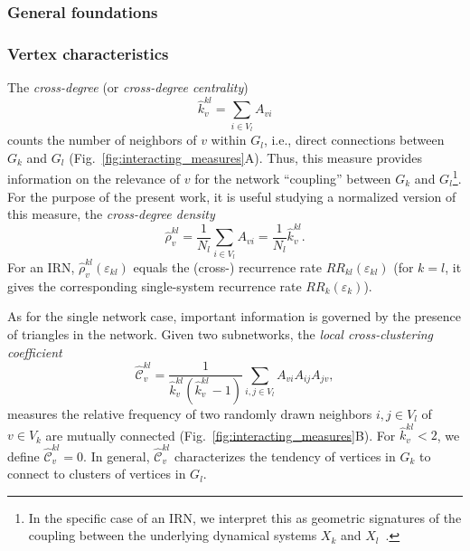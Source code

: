     
		\subsubsection{General foundations}

\subsubsection{Vertex characteristics}

The \textit{cross-degree} (or \textit{cross-degree centrality})
\begin{equation}
\hat{k}_v^{kl} = \sum_{i \in V_l} A_{vi}
\label{eq:degree_cross}
\end{equation}
counts the number of neighbors of $v$ within $G_l$, i.e., direct connections between $G_k$ and $G_l$ (Fig.~\ref{fig:interacting_measures}A). Thus, this measure provides information on the relevance of $v$ for the network ``coupling'' between $G_k$ and $G_l$\footnote{In the specific case of an IRN, we interpret this as geometric signatures of the coupling between the underlying dynamical systems $X_k$ and $X_l$~\cite{Feldhoff2011,Feldhoff2012}.}. For the purpose of the present work, it is useful studying a normalized version of this measure, the \textit{cross-degree density}
\begin{equation}
\hat{\rho}_v^{kl} = \frac{1}{N_l} \sum_{i \in V_l} A_{vi} = \frac{1}{N_l} \hat{k}_v^{kl}.
\label{eq:locrho_cross}
\end{equation}
\noindent
For an IRN, $\hat{\rho}_v^{kl}(\varepsilon_{kl})$ equals the (cross-) recurrence rate $RR_{kl}(\varepsilon_{kl})$ (for $k=l$, it gives the corresponding single-system recurrence rate $RR_k(\varepsilon_k)$).

As for the single network case, important information is governed by the presence of triangles in the network. Given two subnetworks, the \textit{local cross-clustering coefficient}
\begin{equation}
\hat{\mathcal{C}}_v^{kl} = \frac{1}{\hat{k}_v^{kl}(\hat{k}_v^{kl} - 1)} \sum_{i,j \in V_l} A_{vi} A_{ij} A_{jv},
\label{eq:locclustering_cross}
\end{equation}
\noindent
measures the relative frequency of two randomly drawn neighbors $i,j\in V_l$ of $v\in V_k$ are mutually connected (Fig.~\ref{fig:interacting_measures}B). For $\hat{k}_v^{kl}<2$, we define $\hat{\mathcal{C}}_v^{kl}=0$. In general, $\hat{\mathcal{C}}_v^{kl}$ characterizes the tendency of vertices in $G_k$ to connect to clusters of vertices in $G_l$. 

